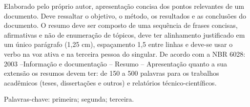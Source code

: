 
\begin{resumo}
\setlength{\baselineskip}{1.5\baselineskip} %

Elaborado pelo próprio autor, apresentação concisa dos pontos relevantes de um documento. Deve ressaltar o objetivo, o método, os resultados e as conclusões do documento. O resumo deve ser composto de uma sequência de frases concisas, afirmativas e não de enumeração de tópicos, deve ter alinhamento justificado em um único parágrafo (1,25 cm), espaçamento 1,5 entre linhas e deve-se usar o verbo na voz ativa e na terceira pessoa do singular. De acordo com a NBR 6028: 2003 –Informação e documentação – Resumo – Apresentação quanto a sua extensão os resumos devem ter: de 150 a 500 palavras para os trabalhos acadêmicos (teses, dissertações e outros) e relatórios técnico-científicos. 

   \vspace{\onelineskip}
\noindent
Palavras-chave: primeira; segunda; terceira. 

\end{resumo}